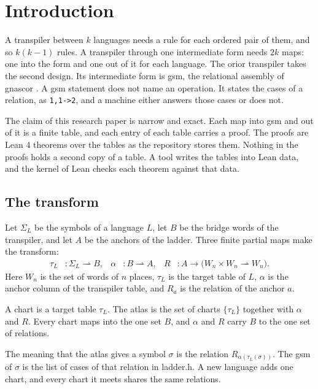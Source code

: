 \chapter{Introduction}
\label{ch:introduction}

A transpiler between $k$ languages needs a rule for each ordered pair of them, and so $k(k-1)$ rules. A
transpiler through one intermediate form needs $2k$ maps: one into the form and one out of it for each language.
The orior transpiler takes the second design. Its intermediate form is gsm, the relational assembly of gnascor
\cite{src:gnascor}. A gsm statement does not name an operation. It states the cases of a relation, as
\texttt{1,1->2}, and a machine either answers those cases or does not.

The claim of this research paper is narrow and exact. Each map into gsm and out of it is a finite table, and each
entry of each table carries a proof. The proofs are Lean 4 theorems \cite{src:lean4} over the tables as the
repository stores them. Nothing in the proofs holds a second copy of a table. A tool writes the tables into Lean
data, and the kernel of Lean checks each theorem against that data.

\section{The transform}

Let $\Sigma_L$ be the symbols of a language $L$, let $B$ be the bridge words of the transpiler, and let $A$ be the
anchors of the ladder. Three finite partial maps make the transform:
\begin{align*}
  \tau_L &: \Sigma_L \rightharpoonup B, &
  \alpha &: B \rightharpoonup A, &
  R &: A \to \bigl(W_n \times W_n \rightharpoonup W_n\bigr).
\end{align*}
Here $W_n$ is the set of words of $n$ places, $\tau_L$ is the target table of $L$, $\alpha$ is the anchor column
of the transpiler table, and $R_a$ is the relation of the anchor $a$.

\begin{definition}
A chart is a target table $\tau_L$. The atlas is the set of charts $\{\tau_L\}$ together with $\alpha$ and $R$.
Every chart maps into the one set $B$, and $\alpha$ and $R$ carry $B$ to the one set of relations.
\end{definition}

The meaning that the atlas gives a symbol $\sigma$ is the relation $R_{\alpha(\tau_L(\sigma))}$. The gsm of
$\sigma$ is the list of cases of that relation in ladder.h. A new language adds one chart, and every chart it meets
shares the same relations.

